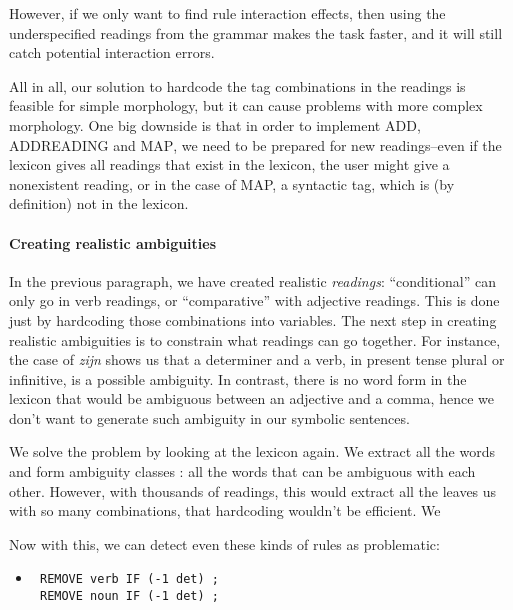 However, if we only want to find rule interaction effects, then using the underspecified readings from the grammar makes the task faster, and it will still catch potential interaction errors.

All in all, our solution to hardcode the tag combinations in the readings is feasible for simple morphology, but it can cause problems with more complex morphology. One big downside is that in order to implement \textsc{ADD}, \textsc{ADDREADING} and \textsc{MAP}, we need to be prepared for new readings--even if the lexicon gives all readings that exist in the lexicon, the user might give a nonexistent reading, or in the case of MAP, a syntactic tag, which is (by definition) not in the lexicon.


\paragraph{Creating realistic ambiguities}

In the previous paragraph, we have created realistic \emph{readings}:  ``conditional'' can only go in verb readings, or ``comparative'' with adjective readings. This is done just by hardcoding those combinations into variables. The next step in creating realistic ambiguities is to constrain what readings can go together. For instance, the case of \emph{zijn} shows us that a determiner and a verb, in present tense plural or infinitive, is a possible ambiguity. In contrast, there is no word form in the lexicon
that would be ambiguous between an adjective and a comma, hence we don't want to generate such ambiguity in our symbolic sentences.

We solve the problem by looking at the lexicon again. We extract all the words and form ambiguity classes : all the words that can be ambiguous with each other. However, with thousands of readings, this would 
extract all the  leaves us with so many combinations, that hardcoding wouldn't be efficient. We






Now with this, we can detect even these kinds of rules as problematic:

 \begin{itemize}
 \item[] \begin{verbatim}
 REMOVE verb IF (-1 det) ;
 REMOVE noun IF (-1 det) ;
 \end{verbatim}
 \end{itemize}

